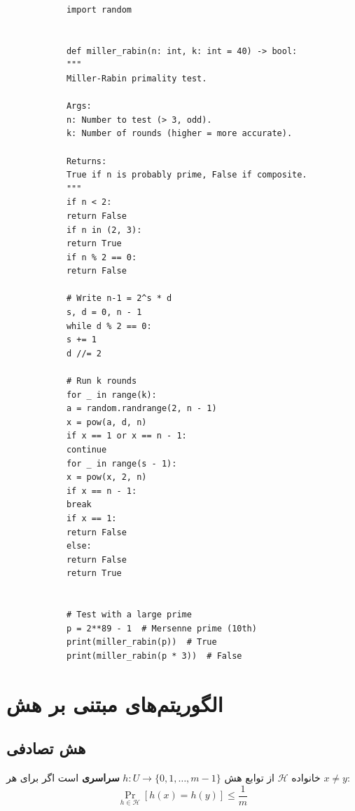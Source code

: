\documentclass{matinbook}
\begin{document}
    \begin{latin}
        \begin{verbatim}
            import random
            
            
            def miller_rabin(n: int, k: int = 40) -> bool:
            """
            Miller-Rabin primality test.
            
            Args:
            n: Number to test (> 3, odd).
            k: Number of rounds (higher = more accurate).
            
            Returns:
            True if n is probably prime, False if composite.
            """
            if n < 2:
            return False
            if n in (2, 3):
            return True
            if n % 2 == 0:
            return False
            
            # Write n-1 = 2^s * d
            s, d = 0, n - 1
            while d % 2 == 0:
            s += 1
            d //= 2
            
            # Run k rounds
            for _ in range(k):
            a = random.randrange(2, n - 1)
            x = pow(a, d, n)
            if x == 1 or x == n - 1:
            continue
            for _ in range(s - 1):
            x = pow(x, 2, n)
            if x == n - 1:
            break
            if x == 1:
            return False
            else:
            return False
            return True
            
            
            # Test with a large prime
            p = 2**89 - 1  # Mersenne prime (10th)
            print(miller_rabin(p))  # True
            print(miller_rabin(p * 3))  # False
        \end{verbatim}
    \end{latin}
    \label{code:miller-rabin}
    
    \section{الگوریتم‌های مبتنی بر هش}
    
    \subsection{هش تصادفی}
    
    \begin{definition}
        خانواده $\mathcal{H}$ از توابع هش
        $h: U \to \{0, 1, \ldots, m-1\}$
        \textbf{سراسری} است اگر
        برای هر $x \neq y$:
        \[
        \Pr_{h \in \mathcal{H}}[h(x) = h(y)] \leq \frac{1}{m}
        \]
        \label{def:universal-hashing}
    \end{definition}
    
\end{document}
